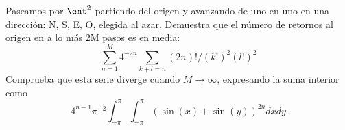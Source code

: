 \begin{problem}[15]
	Paseamos por $\ent^2$ partiendo del origen y avanzando de uno en uno en una dirección: N, S, E, O, elegida al azar. Demuestra que el número de retornos al origen en a lo más 2M pasos es en media:
	\[\sum_{n=1}^M 4^{-2n}\sum_{k+l=n}(2n)!/(k!)^2(l!)^2\]
	Comprueba que esta serie diverge cuando $M \to \infty$, expresando la suma interior como
	\[4^{n-1}π^{-2}\int_{-π}^π\int_{-π}^π\left(\sin(x)+\sin(y)\right)^{2n}dxdy\]
	\solution


\end{problem}